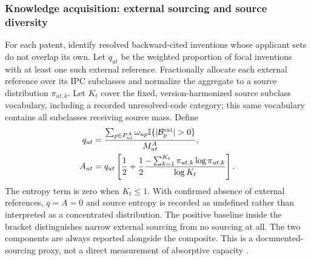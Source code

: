 \subsubsection{Knowledge acquisition: external sourcing and source diversity}
For each patent, identify resolved backward-cited inventions whose applicant sets
do not overlap its own. Let $q_{ut}$ be the weighted proportion of focal inventions
with at least one such external reference. Fractionally allocate each external
reference over its IPC subclasses and normalize the aggregate to a source
distribution $\pi_{ut,k}$. Let $K_t$ cover the fixed, version-harmonized source
subclass vocabulary, including a recorded unresolved-code category; this same
vocabulary contains all subclasses receiving source mass. Define
\begin{align}
 q_{ut}&=\frac{\sum_{p\in P_{ut}^{A}}\omega_{up}
           \ind\{|\mathcal{B}^{\mathrm{ext}}_p|>0\}}{M_{ut}^{A}},\\
 A_{ut}&=q_{ut}\left[\frac12+\frac12
       \frac{-\sum_{k=1}^{K_t}\pi_{ut,k}\log\pi_{ut,k}}{\log K_t}\right].
 \label{eq:acquisition}
\end{align}
The entropy term is zero when $K_t\leq1$. With confirmed absence of external
references, $q=A=0$ and source entropy is recorded as undefined rather than
interpreted as a concentrated distribution. The positive baseline inside the
bracket distinguishes narrow external sourcing from no sourcing at all.
The two components are always reported alongside the composite. This is a
documented-sourcing proxy, not a direct measurement of absorptive capacity
\citep{cohen1990,shannon1948,stirling2007}.

